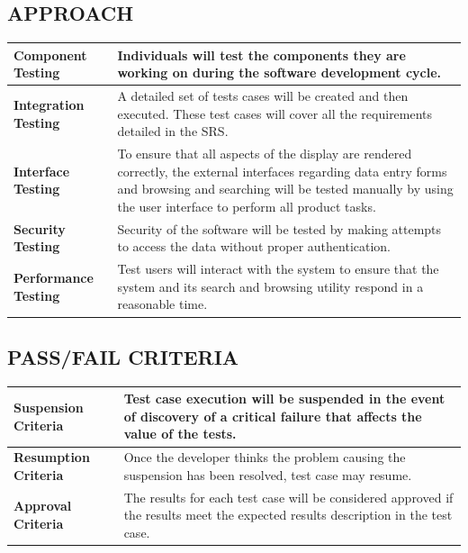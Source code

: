 \documentclass[twoside,letterpaper]{article}
\begin{document}
\subsection{APPROACH}

\begin{center}
\begin{tabular}{ | M{4cm} | M{12cm}| } 
\hline
\textbf{Component Testing} & Individuals will test the components they are working on during the software development cycle.\\ 
\hline
\textbf{Integration Testing} & A detailed set of tests cases will be created and then executed.  These test cases will cover all the requirements detailed in the SRS.\\ 
\hline
\textbf{Interface Testing} & To ensure that all aspects of the display are rendered correctly, the external interfaces regarding data entry forms and browsing and searching will be tested manually by using the user interface to perform all product tasks.\\ 
\hline
\textbf{Security Testing} & Security of the software will be tested by making attempts to access the data without proper authentication.\\ 
\hline
\textbf{Performance Testing} & Test users will interact with the system to ensure that the system and its search and browsing utility respond in a reasonable time.\\ 
\hline
\end{tabular}
\end{center}

\subsection{PASS/FAIL CRITERIA}
\begin{center}
\begin{tabular}{ | M{4cm} | M{12cm}| } 
\hline
\textbf{Suspension Criteria} & Test case execution will be suspended in the event of discovery of a critical failure that affects the value of the tests.\\ 
\hline
\textbf{Resumption Criteria} & Once the developer thinks the problem causing the suspension has been resolved, test case may resume.\\ 
\hline
\textbf{Approval Criteria} & The results for each test case will be considered approved if the results meet the expected results description in the test case.\\ 
\hline
\end{tabular}
\end{center}
\end{document}
